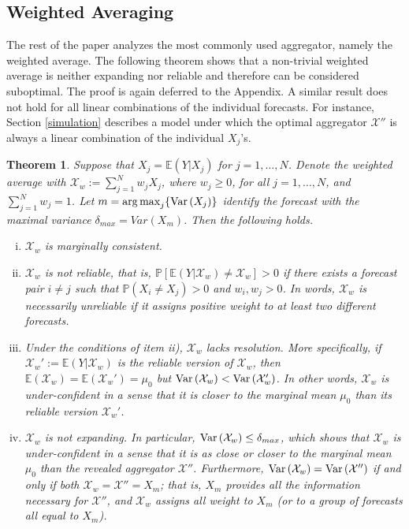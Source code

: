 \documentclass[12pt]{article}
\renewcommand{\P}{\mathbb{P}}
\newcommand{\E}{\mathbb{E}}
\newtheorem{theorem}{Theorem}[section]
\DeclareMathOperator*{\argmax}{arg\,max}
\theoremstyle{definition}
\theoremstyle{definition}
\def\P{{\mathbb P}}
\def\E{{\mathbb E}}
\def\Var{{\rm Var}\,}
\begin{document}
\subsection{Weighted Averaging} \label{contraction}

The rest of the paper analyzes the most commonly used aggregator, namely the weighted average. The following theorem shows that a non-trivial weighted average is neither expanding nor reliable and therefore can be considered suboptimal. The proof is again deferred to the Appendix. A similar result does not hold for all linear combinations of the individual forecasts. For instance, Section \ref{simulation} describes a model under which the optimal aggregator $\mathcal{X}''$ is always a linear combination of the individual $X_j$'s.




\begin{theorem}\label{contraction}
Suppose that $X_j = \E(Y | X_j)$ for $j = 1, \dots, N$. Denote the weighted average with $\mathcal{X}_w := \sum_{j=1}^N w_jX_j$, where  $w_j \geq 0$, for all $j = 1, \dots, N$, and $\sum_{j=1}^N w_j = 1$.  Let $m = \argmax_j \{ \Var(X_j)  \}$ identify the forecast with the maximal variance $\delta_{max} = Var(X_m)$. Then the following holds.
\begin{enumerate}[i)]
\item  $\mathcal{X}_w$ is marginally consistent.

\item $\mathcal{X}_w$ is not reliable, that is, $\P\left[\E(Y | \mathcal{X}_w) \neq \mathcal{X}_w\right] > 0$ if there exists a forecast pair $i \neq j$ such that $\P(X_i \neq X_j) > 0$ and $w_i, w_j > 0$. In words, $\mathcal{X}_w$ is necessarily unreliable if it assigns positive weight to at least two different forecasts. 
 
 \item Under the conditions of item ii), $\mathcal{X}_w$ lacks resolution. More specifically, if $\mathcal{X}_w' :=  \E(Y| \mathcal{X}_w)$ is the reliable version of $\mathcal{X}_w$, then $\E(\mathcal{X}_w) = \E(\mathcal{X}_w') = \mu_0$ but $\Var(\mathcal{X}_w) < \Var(\mathcal{X}_w')$. In other words, $\mathcal{X}_w$ is under-confident in a sense that it is closer to the marginal mean $\mu_0$ than its reliable version $\mathcal{X}_w'$. \label{underconfA}
 
\item $\mathcal{X}_w$ is not expanding. In particular, $\Var(\mathcal{X}_w) \leq \delta_{max}$, which shows that $\mathcal{X}_w$ is under-confident in a sense that it is as close or closer to the marginal mean $\mu_0$ than the revealed aggregator $\mathcal{X}''$.  Furthermore, $\Var(\mathcal{X}_w) = \Var(\mathcal{X}'')$ if and only if both $\mathcal{X}_w = \mathcal{X}'' = X_m$; that is,  $X_m$ provides all the information necessary for $\mathcal{X}''$, and $\mathcal{X}_w$ assigns all weight to $X_m$ (or to a group of forecasts all equal to $X_m$). \label{underconfB}
\end{enumerate}
\end{theorem}
\end{document}

